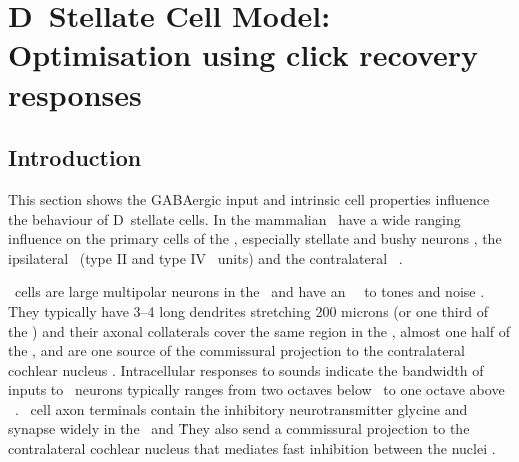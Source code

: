 \section[DS Cell Model]{D~Stellate Cell Model: Optimisation using click recovery responses}   \label{sec:d-stellate-cell-model}

\subsection{Introduction}

This section shows the GABAergic input and intrinsic cell properties influence the behaviour of D~stellate cells.
In the mammalian \VCN~have a wide ranging influence on the primary cells of the \VCN, especially stellate and bushy neurons \citep{RhodeSmithEtAl:1983}, the ipsilateral \DCN~(type II and type IV \EIRA~units) and the contralateral \CN~\citep{NeedhamPaolini:2007}.



\DS~cells are large multipolar neurons in the \VCN~and have an \OnC~\PSTH~to tones and noise \citep{SmithRhode:1989,NeedhamPaolini:2006}.
They typically have 3--4 long dendrites stretching 200 microns (or one third of the \VCN) and their axonal collaterals cover the same region in the \VCN, almost one half of the \DCN, and are one source of the commissural projection to the contralateral cochlear nucleus \citep{Cant:1992,Cant:1981,SchofieldCant:1996,CantBenson:2003,NeedhamPaolini:2007,PaoliniClark:1999}.
Intracellular responses to sounds indicate the bandwidth of inputs to \DS~neurons typically ranges from two octaves below \CF~to one octave above \CF~\citep{PalmerJiangEtAl:1996,JiangPalmerEtAl:1996,PaoliniClark:1999}.
\DS~cell axon terminals contain the inhibitory neurotransmitter glycine and synapse widely in the \VCN~and \DCN\.
They also send a commissural projection to the contralateral cochlear nucleus that mediates fast inhibition between the nuclei \citep{NeedhamPaolini:2003,NeedhamPaolini:2006,Oertel:1997}.

